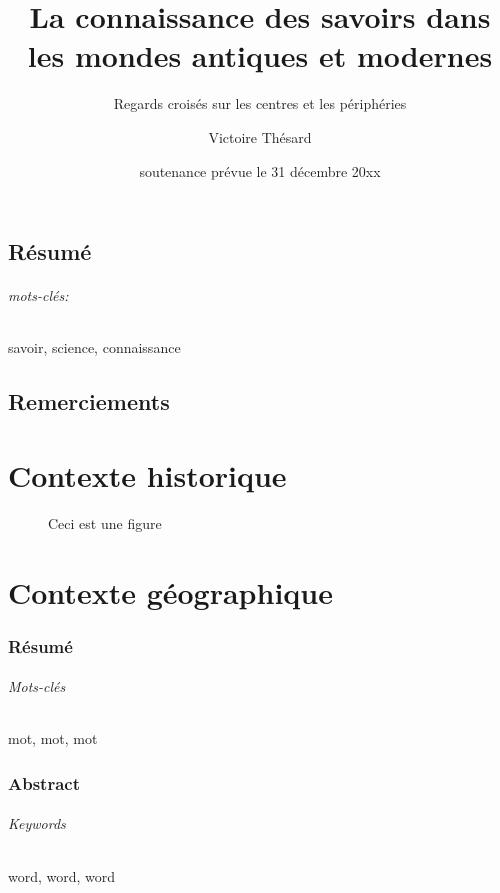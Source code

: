 \documentclass{scrbook}
\title{La connaissance des savoirs dans les mondes antiques et modernes}
\subtitle{Regards croisés sur les centres et les périphéries}
\author{Victoire Thésard}
\date{soutenance prévue le 31 décembre 20xx}%
\begin{document}
\maketitle

\frontmatter
\chapter{Résumé}
\blindtext

\paragraph{mots-clés:} savoir, science, connaissance

\chapter{Remerciements}
\blindtext

\mainmatter

\part{Contexte historique}
\blinddocument

\begin{figure}[h]
 \centering
 \caption{Ceci est une figure}
\end{figure}

\blinddocument

\part{Contexte géographique}
\blinddocument
\blinddocument

\appendix
\blinddocument

\backmatter

\tableofcontents

\begin{verso}
\section*{Résumé}
\blindtext

\paragraph{Mots-clés} mot, mot, mot

\section*{Abstract}
\blindtext
\paragraph{Keywords} word, word, word
\end{verso}
\end{document}
